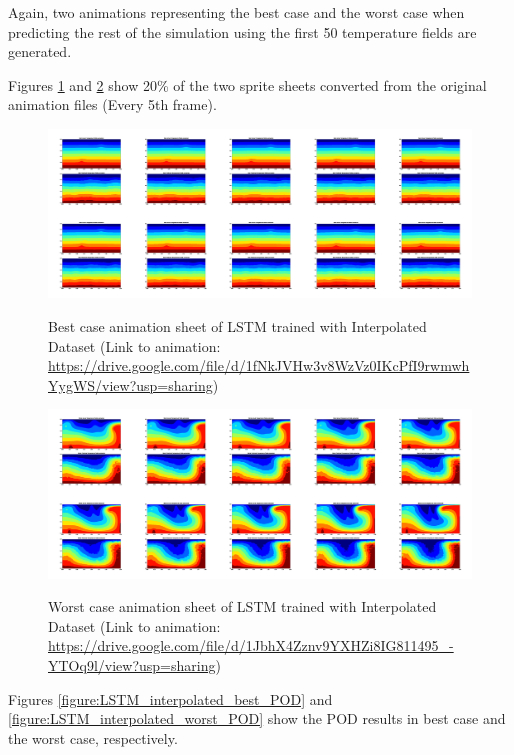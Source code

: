 Again, two animations representing the best case and the worst case when predicting the rest of the simulation using the first 50 temperature fields are generated.

Figures \ref{figure:LSTM_interpolated_best_gif} and \ref{figure:LSTM_interpolated_worst_gif} show 20\% of the two sprite sheets converted from the original animation files (Every 5th frame).

\begin{figure}[H]
    \centering
    \caption{Best case animation sheet of LSTM trained with Interpolated Dataset (Link to animation: \url{https://drive.google.com/file/d/1fNkJVHw3v8WzVz0IKcPfI9rwmwhYygWS/view?usp=sharing})}
    \includegraphics[scale=0.10]{figures/mantle_convection_images/larger_dataset_interpolated/LSTM_Best_GIF_sheet.png}
     \label{figure:LSTM_interpolated_best_gif}
\end{figure}

\begin{figure}[H]
    \centering
    \caption{Worst case animation sheet of LSTM trained with Interpolated Dataset (Link to animation: 
    \url{https://drive.google.com/file/d/1JbhX4Zznv9YXHZi8IG811495_-YTOq9l/view?usp=sharing})}
    \includegraphics[scale=0.10]{figures/mantle_convection_images/larger_dataset_interpolated/LSTM_Worst_GIF_sheet.png}
    \label{figure:LSTM_interpolated_worst_gif}
\end{figure}

Figures \ref{figure:LSTM_interpolated_best_POD} and \ref{figure:LSTM_interpolated_worst_POD} show the POD results in best case and the worst case, respectively.

